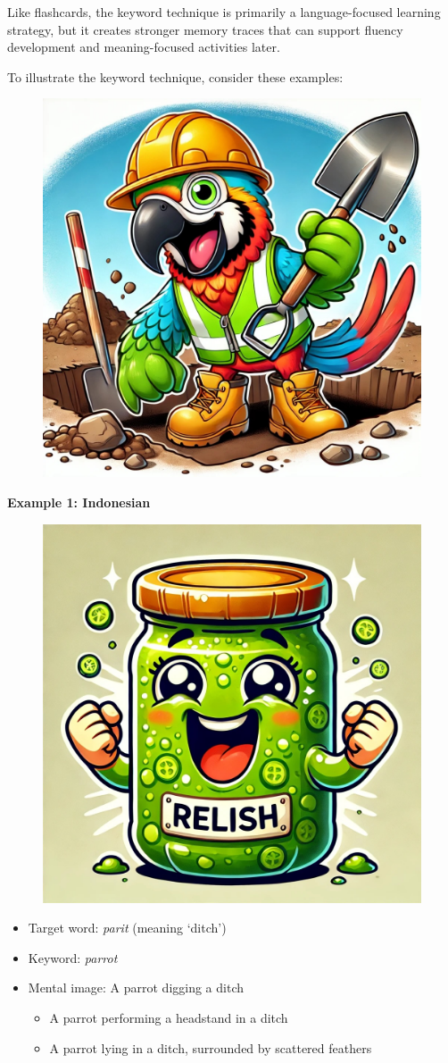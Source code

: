 Like flashcards, the keyword technique is primarily a language-focused learning strategy, but it creates stronger memory traces that can support fluency development and meaning-focused activities later.

\begin{tcolorbox}[title=Keyword Technique Examples, colback=white, colframe=blue!75!black, fonttitle=\bfseries]

To illustrate the keyword technique, consider these examples:

\begin{figure}
\includegraphics[width=0.5\linewidth]{figures/parrot.jpg}
\end{figure}

\textbf{Example 1: Indonesian}


\begin{figure}
\includegraphics[width=0.5\linewidth]{figures/relish.jpg}
\end{figure}

\begin{itemize}
    \item Target word: \textit{parit} (meaning `ditch')
    \item Keyword: \textit{parrot}
    \item Mental image: A parrot digging a ditch
    \begin{itemize}
        \item A parrot performing a headstand in a ditch
        \item A parrot lying in a ditch, surrounded by scattered feathers 
    \end{itemize}
\end{itemize}




\end{tcolorbox}
